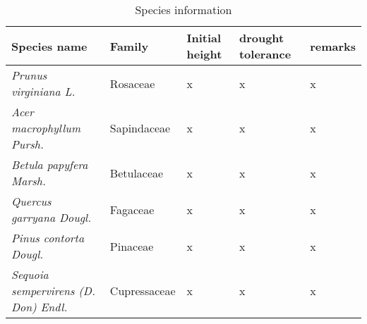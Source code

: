 \documentclass{article}
\begin{document}
			\begin{table}[H]
		\centering
		\caption{Species information}
		\begin{tabular}{p{5.8cm} p{2cm} p{2.0cm} p{1.0cm} p{3cm}}
			\toprule
			\textbf{Species name} & \textbf{Family} & \textbf{Initial height} & \textbf{drought tolerance} & \textbf{remarks} \\
			\midrule
			\textit{Prunus virginiana L.} & Rosaceae & x & x &  x  \\
			\textit{Acer macrophyllum Pursh.} & Sapindaceae & x & x & x \\
			\textit{Betula papyfera Marsh.} & Betulaceae &x & x & x \\
			\textit{Quercus garryana Dougl.} & Fagaceae & x & x & x \\
			\textit{Pinus contorta Dougl.} & Pinaceae & x & x &  x\\
			\textit{Sequoia sempervirens (D. Don) Endl.} & Cupressaceae & x & x & x \\
			
			\bottomrule
		\end{tabular}
	\end{table}
	
	
				
	
\end{document}
